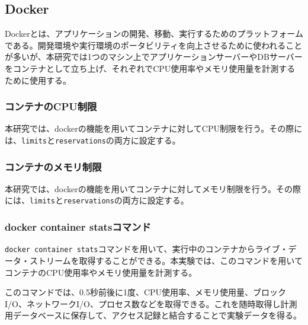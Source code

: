 \documentclass[../../../main]{subfiles}
\begin{document}
    \subsection{Docker}\label{subsec:phraseology-docker}

    Dockerとは、アプリケーションの開発、移動、実行するためのプラットフォームである。開発環境や実行環境のポータビリティを向上させるために使われることが多いが、本研究では1つのマシン上でアプリケーションサーバーやDBサーバーをコンテナとして立ち上げ、それぞれでCPU使用率やメモリ使用量を計測するために使用する。\cite{Docker概要}

    \subsubsection{コンテナのCPU制限}\label{subsubsec:phraseology-docker-cpu-limit}

    本研究では、dockerの機能を用いてコンテナに対してCPU制限を行う。その際には、\texttt{limits}と\texttt{reservations}の両方に設定する。\cite{Docker制限}

    \subsubsection{コンテナのメモリ制限}\label{subsubsec:phraseology-docker-memory-limit}

    本研究では、dockerの機能を用いてコンテナに対してメモリ制限を行う。その際には、\texttt{limits}と\texttt{reservations}の両方に設定する。\cite{Docker制限}

    \subsubsection{docker container statsコマンド}\label{subsubsec:phraseology-docker-container-stats}

    \texttt{docker container stats}コマンドを用いて、実行中のコンテナからライブ・データ・ストリームを取得することができる。本実験では、このコマンドを用いてコンテナのCPU使用率やメモリ使用量を計測する。

    このコマンドでは、0.5秒前後に1度、CPU使用率、メモリ使用量、ブロックI/O、ネットワークI/O、プロセス数などを取得できる。これを随時取得し計測用データベースに保存して、アクセス記録と結合することで実験データを得る。\cite{Docker Stats}
\end{document}
